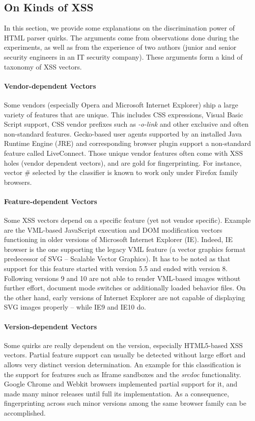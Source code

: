 \documentclass[10pt]{IEEEtran}
\begin{document}
\subsection{On Kinds of XSS}
\label{sec:xss-kind}
In this section, we provide some explanations on the discrimination power of HTML parser quirks.
The arguments come from observations done during the experiments, 
as well as from the experience of two authors (junior and senior security engineers in an IT security company).
These arguments form a kind of taxonomy of XSS vectors.
 
\paragraph{Vendor-dependent Vectors} Some vendors (especially Opera and Microsoft Internet Explorer) ship a 
 large variety of features that are unique. 
 This includes CSS expressions, Visual Basic Script support, CSS vendor prefixes such 
 as \textit{-o-link} and other exclusive and often non-standard features. Gecko-based user 
 agents supported by an installed Java Runtime Engine (JRE) and corresponding browser plugin 
 support a non-standard feature called LiveConnect.
 Those unique vendor features often come with XSS holes (vendor dependent vectors), and are gold for fingerprinting.
 For instance, vector \# 
 selected by the classifier is known to work only under Firefox family browsers.
 
\paragraph{Feature-dependent Vectors} Some XSS vectors depend on a specific feature (yet not vendor specific). 
 Example are the VML-based JavaScript execution and DOM modification 
 vectors functioning in older versions of Microsoft Internet Explorer (IE). Indeed, IE browser is the 
 one supporting the legacy VML feature (a vector graphics format predecessor of SVG -- Scalable Vector Graphics). 
 It has to be noted as that support for this feature started with version 5.5 and ended 
 with version 8. Following versions 9 and 10 are not able to render VML-based images without 
 further effort, document mode switches or additionally loaded behavior files. On the other hand, 
 early versions of Internet Explorer are not capable of displaying SVG images properly -- 
 while IE9 and IE10 do.
 
\paragraph{Version-dependent Vectors} 
  Some quirks are really dependent on the version, especially HTML5-based XSS vectors.
  Partial feature support can usually be detected without large effort 
  and allows very distinct version determination. An example for this classification is the 
  support for features such as Iframe sandboxes and the \textit{srcdoc} functionality. Google 
  Chrome and Webkit browsers implemented partial support for it, and made many minor releases 
   until full its implementation. As a consequence,
  fingerprinting across such minor  versions among the same browser family can be accomplished.   
 
\end{document}
